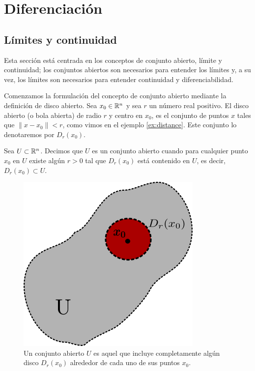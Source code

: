 \chapter{Diferenciación}\label{ch:diferenciacion}
\section{Límites y continuidad}

Esta sección está centrada en los conceptos de conjunto abierto, límite y continuidad; los conjuntos abiertos son necesarios para entender los límites y, a su vez, los límites son necesarios para entender continuidad y diferenciabilidad.

Comenzamos la formulación del concepto de conjunto abierto mediante la definición de disco abierto. Sea $x_{0}
\in  \mathbb{R}^{n}$ y sea $r$ un número real positivo. El disco abierto (o bola abierta) de radio $r$ y centro 
en $x_{0}$, es el conjunto de puntos $x$ tales que $\|x-x_{0}\| < r $, como vimos en el ejemplo \ref{ex:distance}. Este 
conjunto lo denotaremos por $D_{r}(x_{0})$.

\begin{definition}
    Sea $U \subset \mathbb{R}^{n}$. Decimos que $U$ es un conjunto abierto cuando para cualquier punto $x_{0}$ en $U$ existe algún $r>0$
    tal que $D_{r}(x_{0})$ está contenido en $U$, es decir, $D_{r}(x_{0}) \subset U$.
\end{definition}

\begin{figure}[!ht]
  \begin{center}
      \includegraphics[width=0.5\linewidth]{gfx/conjunto-abierto}
      \caption{Un conjunto abierto $U$ es aquel que incluye completamente algún disco $D_{r}(x_{0})$ alrededor
      de cada uno de sus puntos $x_{0}$.}
      \label{fig:boat1}
  \end{center}
\end{figure}

